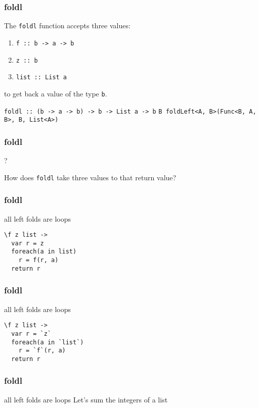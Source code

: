 \begin{frame}
\frametitle{foldl}
The \lstinline[basicstyle=\ttfamily]$foldl$ function accepts three values:
\begin{enumerate}
\item \lstinline[basicstyle=\ttfamily]$f :: b -> a -> b$
\item \lstinline[basicstyle=\ttfamily]$z :: b$
\item \lstinline[basicstyle=\ttfamily]$list :: List a$
\end{enumerate}
to get back a value of the type \lstinline[basicstyle=\ttfamily]$b$.

\hrulefill

\lstinline[basicstyle=\ttfamily]$foldl :: (b -> a -> b) -> b -> List a -> b$
\lstinline[basicstyle=\ttfamily]$B foldLeft<A, B>(Func<B, A, B>, B, List<A>)$
\end{frame}

\begin{frame}
\frametitle{foldl}
\begin{block}{?}
\begin{center}
How does \lstinline[basicstyle=\ttfamily]$foldl$ take three values to that return value?
\end{center}
\end{block}
\end{frame}

\begin{frame}[fragile]
\frametitle{foldl}
\begin{block}{all left folds are loops}
\begin{lstlisting}[style=haskell,basicstyle=\scriptsize\ttfamily,mathescape]
\f z list ->
  var r = z
  foreach(a in list)
    r = f(r, a)
  return r
\end{lstlisting}
\end{block}
\end{frame}

\begin{frame}[fragile]
\frametitle{foldl}
\begin{block}{all left folds are loops}
\begin{lstlisting}[style=haskell,basicstyle=\scriptsize\ttfamily,mathescape]
\f z list ->
  var r = `z`
  foreach(a in `list`)
    r = `f`(r, a)
  return r
\end{lstlisting}
\end{block}
\end{frame}

\begin{frame}[fragile]
\frametitle{foldl}
\begin{block}{all left folds are loops}
Let's sum the integers of a list
\end{block}
\end{frame}

